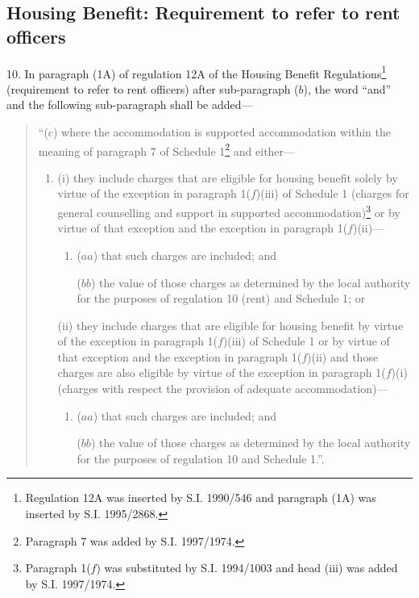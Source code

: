 \documentclass[12pt,a4paper]{article}
\begin{document}
\subsection[10. Housing Benefit: Requirement to refer to rent officers]{Housing Benefit: Requirement to refer to rent officers}

10.  In paragraph (1A) of regulation 12A of the Housing Benefit Regulations\footnote{\frenchspacing Regulation 12A was inserted by S.I. 1990/546 and paragraph (1A) was inserted by S.I. 1995/2868.} (requirement to refer to rent officers) after sub-paragraph ($b$), the word “and” and the following sub-paragraph shall be added—
\begin{quotation}
“($c$) where the accommodation is supported accommodation within the meaning of paragraph 7 of Schedule 1\footnote{\frenchspacing Paragraph 7 was added by S.I. 1997/1974.} and either—
\begin{enumerate}\item[]
(i) they include charges that are eligible for housing benefit solely by virtue of the exception in paragraph 1($f$)(iii)  of Schedule 1 (charges for general counselling and support in supported accommodation)\footnote{\frenchspacing Paragraph 1($f$) was substituted by S.I. 1994/1003 and head (iii) was added by S.I. 1997/1974.} or by virtue of that exception and the exception in paragraph 1($f$)(ii)—
\begin{enumerate}\item[]
($aa$) that such charges are included; and

($bb$) the value of those charges as determined by the local authority for the purposes of regulation 10 (rent) and Schedule 1; or
\end{enumerate}

(ii) they include charges that are eligible for housing benefit by virtue of the exception in paragraph 1($f$)(iii)  of Schedule 1 or by virtue of that exception and the exception in paragraph 1($f$)(ii)  and those charges are also eligible by virtue of the exception in paragraph 1($f$)(i)  (charges with respect the provision of adequate accommodation)—
\begin{enumerate}\item[]
($aa$) that such charges are included; and

($bb$) the value of those charges as determined by the local authority for the purposes of regulation 10 and Schedule 1.”.
\end{enumerate}
\end{enumerate}
\end{quotation}
\end{document}
